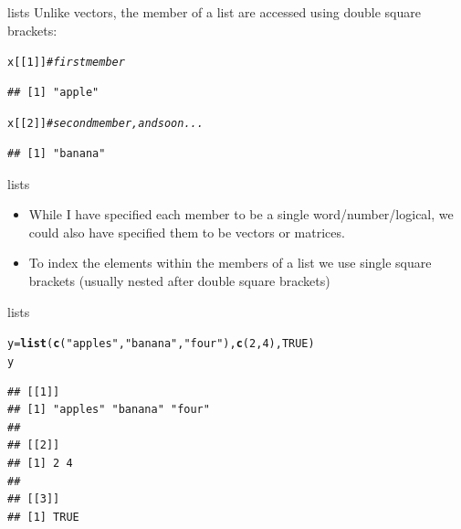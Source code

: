 \documentclass[xcolor=svgnames, 10pt]{beamer}
\makeatletter
\newcommand{\hlnum}[1]{\textcolor[rgb]{0.686,0.059,0.569}{#1}}%
\newcommand{\hlstr}[1]{\textcolor[rgb]{0.192,0.494,0.8}{#1}}%
\newcommand{\hlcom}[1]{\textcolor[rgb]{0.678,0.584,0.686}{\textit{#1}}}%
\newcommand{\hlstd}[1]{\textcolor[rgb]{0.345,0.345,0.345}{#1}}%
\newcommand{\hlkwb}[1]{\textcolor[rgb]{0.69,0.353,0.396}{#1}}%
\newcommand{\hlkwd}[1]{\textcolor[rgb]{0.737,0.353,0.396}{\textbf{#1}}}%
\newenvironment{kframe}{%
 \def\at@end@of@kframe{}%
 \ifinner\ifhmode%
  \def\at@end@of@kframe{\end{minipage}}%
  \begin{minipage}{\columnwidth}%
 \fi\fi%
 \def\FrameCommand##1{\hskip\@totalleftmargin \hskip-\fboxsep
 \colorbox{shadecolor}{##1}\hskip-\fboxsep
     \hskip-\linewidth \hskip-\@totalleftmargin \hskip\columnwidth}%
 \MakeFramed {\advance\hsize-\width
   \@totalleftmargin\z@ \linewidth\hsize
   \@setminipage}}%
 {\par\unskip\endMakeFramed%
 \at@end@of@kframe}
\newenvironment{knitrout}{}{} %
\makeatother
\begin{document}
\begin{frame}[fragile]{lists}
Unlike vectors, the member of a list are accessed using double square brackets:
\begin{knitrout}\footnotesize
{}\color{fgcolor}\begin{kframe}
\begin{alltt}
\hlstd{x[[}\hlnum{1}\hlstd{]]} \hlcom{# first member}
\end{alltt}
\begin{verbatim}
## [1] "apple"
\end{verbatim}
\begin{alltt}
\hlstd{x[[}\hlnum{2}\hlstd{]]} \hlcom{# second member, and so on ...}
\end{alltt}
\begin{verbatim}
## [1] "banana"
\end{verbatim}
\end{kframe}
\end{knitrout}
\end{frame}

\begin{frame}[fragile]{lists}
\begin{itemize}
\item While I have specified each member to be a single word/number/logical, we could also have specified them to be vectors or matrices. 
\item To index the elements within the members of a list we use single square brackets (usually nested after double square brackets)
\end{itemize}
\end{frame}


\begin{frame}[fragile]{lists}
\begin{knitrout}\footnotesize
{}\color{fgcolor}\begin{kframe}
\begin{alltt}
\hlstd{y} \hlkwb{=} \hlkwd{list}\hlstd{(}\hlkwd{c}\hlstd{(}\hlstr{"apples"}\hlstd{,} \hlstr{"banana"}\hlstd{,} \hlstr{"four"}\hlstd{),} \hlkwd{c}\hlstd{(}\hlnum{2}\hlstd{,}\hlnum{4}\hlstd{),} \hlnum{TRUE}\hlstd{)}
\hlstd{y}
\end{alltt}
\begin{verbatim}
## [[1]]
## [1] "apples" "banana" "four"  
## 
## [[2]]
## [1] 2 4
## 
## [[3]]
## [1] TRUE
\end{verbatim}
\end{kframe}
\end{knitrout}
\end{frame}
\end{document}
